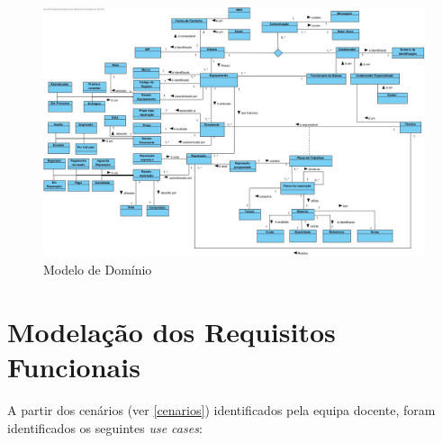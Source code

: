 \documentclass[a4paper,12pt]{scrreprt}
\begin{document}
\begin{figure}[!ht]
    \centering
    \includegraphics[scale=0.40]{ModeloDominio.jpg}
    \caption{Modelo de Domínio}
\end{figure}

\chapter{Modelação dos Requisitos Funcionais} \label{modelacao_req_funcionais}

A partir dos cenários (ver \ref{cenarios}) identificados pela equipa docente, 
foram identificados os seguintes \textit{use cases}:
\end{document}
